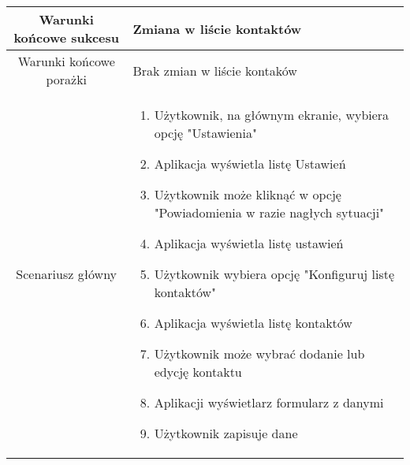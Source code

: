 \documentclass{article}
\begin{document}
\begin{enumerate}
\begin{enumerate}
\begin{table}[H]
\begin{tabular}{|c|p{7cm}|}
						\hline
						Warunki końcowe sukcesu & Zmiana w liście kontaktów                                                                                                                                                                                                                                                                                                                                                                                                                                                                                                                                \\
						\hline
						Warunki końcowe porażki & Brak zmian w liście kontaków                                                                                                                                                                                                                                                                                                                                                                                                                                                                                                                             \\
						\hline
						Scenariusz główny       & \begin{enumerate}\item Użytkownik, na głównym ekranie, wybiera opcję "Ustawienia"

\item Aplikacja wyświetla listę Ustawień

\item Użytkownik może kliknąć w opcję "Powiadomienia w razie nagłych sytuacji"

\item Aplikacja wyświetla listę ustawień

\item Użytkownik wybiera opcję "Konfiguruj listę kontaktów"

\item Aplikacja wyświetla listę kontaktów

\item Użytkownik może wybrać dodanie lub edycję kontaktu

\item Aplikacji wyświetlarz formularz z danymi

\item Użytkownik zapisuje dane


\end{enumerate}
\end{tabular}
\end{table}
\end{enumerate}
\end{enumerate}
\end{document}
